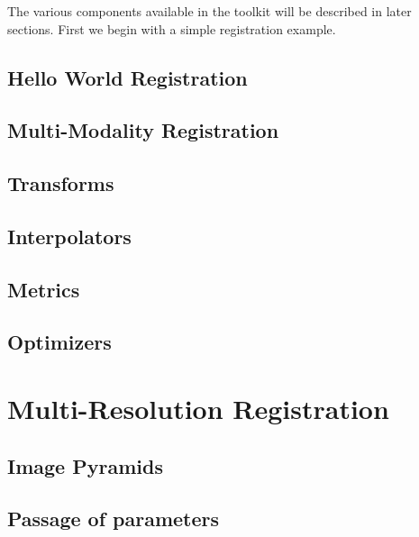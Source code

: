 The various components available in the toolkit will be described in later sections.
First we begin with a simple registration example.

\section{Hello World Registration}
\label{sec:IntroductionImageRegistration}
%


\section{Multi-Modality Registration}
\label{sec:MultiModalityRegistration}


\section{Transforms}
\label{sec:Transforms}


\section{Interpolators}
\label{sec:Interpolators}


\section{Metrics}
\label{sec:Metrics}


\section{Optimizers}
\label{sec:Optimizers}


\chapter{Multi-Resolution Registration}
\label{sec:MultiResolutionRegistration}

\section{Image Pyramids}
\label{sec:ImagePyramids}


\section{Passage of parameters}
\label{sec:MultiResolutionParametersPassing}


